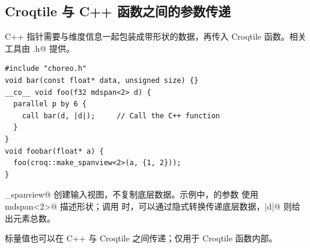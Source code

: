 \subsection*{Croqtile 与 C++ 函数之间的参数传递}

C++ 指针需要与维度信息一起包装成带形状的数据，再传入 Croqtile 函数。相关工具由 \co@choreo.h@ 提供。

\begin{lstlisting}[language=croqtile,caption={Croqtile 与 C 函数之间的参数传递}]
#include "choreo.h"
void bar(const float* data, unsigned size) {}
__co__ void foo(f32 mdspan<2> d) {
  parallel p by 6 {
    call bar(d, |d|);     // Call the C++ function
  }
}
void foobar(float* a) {
  foo(croq::make_spanview<2>(a, {1, 2}));
}
\end{lstlisting}

\co@make_spanview@ 创建输入视图，不复制底层数据。示例中，\co@foo@ 的参数 \co@d@ 使用  mdspan<2>@ 描述形状；调用 \co@bar@ 时，可以通过隐式转换传递底层数据，\co@|d|@ 则给出元素总数。

标量值也可以在 C++ 与 Croqtile 之间传递；\co@ituple@ 仅用于 Croqtile 函数内部。
